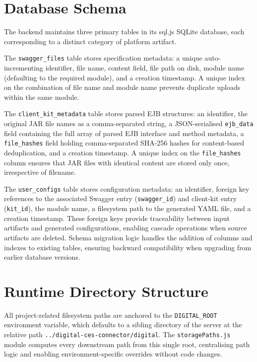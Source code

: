 \section{Database Schema}

The backend maintains three primary tables in its sql.js SQLite database, each corresponding to a distinct category of platform artifact.

The \texttt{swagger\_files} table stores specification metadata: a unique auto-incrementing identifier, file name, content field, file path on disk, module name (defaulting to the required module), and a creation timestamp. A unique index on the combination of file name and module name prevents duplicate uploads within the same module.

The \texttt{client\_kit\_metadata} table stores parsed EJB structures: an identifier, the original JAR file names as a comma-separated string, a JSON-serialised \texttt{ejb\_data} field containing the full array of parsed EJB interface and method metadata, a \texttt{file\_hashes} field holding comma-separated SHA-256 hashes for content-based deduplication, and a creation timestamp. A unique index on the \texttt{file\_hashes} column ensures that JAR files with identical content are stored only once, irrespective of filename.

The \texttt{user\_configs} table stores configuration metadata: an identifier, foreign key references to the associated Swagger entry (\texttt{swagger\_id}) and client-kit entry (\texttt{kit\_id}), the module name, a filesystem path to the generated YAML file, and a creation timestamp. These foreign keys provide traceability between input artifacts and generated configurations, enabling cascade operations when source artifacts are deleted. Schema migration logic handles the addition of columns and indexes to existing tables, ensuring backward compatibility when upgrading from earlier database versions.

\section{Runtime Directory Structure}

All project-related filesystem paths are anchored to the \texttt{DIGITAL\_ROOT} environment variable, which defaults to a sibling directory of the server at the relative path \texttt{../\allowbreak digital-ces-connector/\allowbreak digital}. The \texttt{storagePaths.js} module computes every downstream path from this single root, centralising path logic and enabling environment-specific overrides without code changes.

